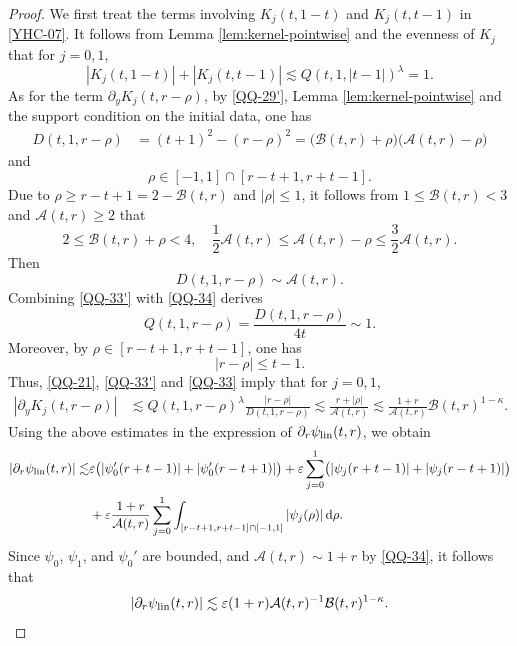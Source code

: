 \documentclass[11pt,twoside]{article}
\newcommand{\p}{\partial}
\newcommand{\ve}{\varepsilon}
\newcommand{\f}{\frac}
\newcommand{\Acal}{\mathcal A}
\newcommand{\Bcal}{\mathcal B}
\newcommand{\dd}{\,\mathrm{d}}
\theoremstyle{plain}
\theoremstyle{definition}
\theoremstyle{remark}
\numberwithin{equation}{section}
\begin{document}
\begin{proof}
We first treat the terms involving $K_j(t,1-t)$ and
$K_j(t,t-1)$ in \eqref{YHC-07}. It follows from Lemma \ref{lem:kernel-pointwise} and the evenness of $K_j$ that for $j=0,1$,
\[
|K_j(t,1-t)|
+|K_j(t,t-1)|\lesssim Q(t,1,|t-1|)^{\lambda}
=1.
\]
As for the  term $\p_yK_j(t,r-\rho)$, by \eqref{QQ-29'}, Lemma \ref{lem:kernel-pointwise} and the support condition on the initial
data, one has
\[
\begin{aligned}
D(t,1,r-\rho)
&=(t+1)^2-(r-\rho)^2=
\bigl(\Bcal(t,r)+\rho\bigr)
\bigl(\Acal(t,r)-\rho\bigr)
\end{aligned}
\]
and
\[
\rho\in[-1,1]\cap[r-t+1,r+t-1].
\]
Due to
$
\rho\geq r-t+1=2-\Bcal(t,r)
$
and $|\rho|\leq1$, it follows from $1\leq\Bcal(t,r)<3$ and $\Acal(t,r)\geq2$ that
\[
2\leq\Bcal(t,r)+\rho<4, \quad \f12\Acal(t,r)
\leq
\Acal(t,r)-\rho
\leq
\f32\Acal(t,r).
\]
Then
\begin{equation}\label{QQ-33'}
D(t,1,r-\rho)\sim\Acal(t,r).
\end{equation}
Combining \eqref{QQ-33'} with \eqref{QQ-34} derives
\begin{equation}\label{QQ-33}
Q(t,1,r-\rho)
=\f{D(t,1,r-\rho)}{4t}
\sim1.
\end{equation}
Moreover, by
$\rho\in[r-t+1,r+t-1]$, one has
\[
|r-\rho|\leq t-1.
\]
Thus, \eqref{QQ-21}, \eqref{QQ-33'} and \eqref{QQ-33} imply that
for $j=0,1$,
\[
\begin{aligned}
|\p_yK_j(t,r-\rho)|
&\lesssim
Q(t,1,r-\rho)^\lambda
\f{|r-\rho|}{D(t,1,r-\rho)}\lesssim
\f{r+|\rho|}{\Acal(t,r)}
\lesssim
\f{1+r}{\Acal(t,r)}\Bcal(t,r)^{1-\kappa}.
\end{aligned}
\]
Using the above estimates in the expression of
$\p_r\psi_{\rm lin}(t,r)$, we obtain
\[
\begin{aligned}
|\p_r\psi_{\rm lin}(t,r)|
\lesssim&
\ve\bigl(
|\psi_0'(r+t-1)|
+|\psi_0'(r-t+1)|
\bigr)+
\ve\sum_{j=0}^1
\bigl(
|\psi_j(r+t-1)|
+|\psi_j(r-t+1)|
\bigr)\\
&+\ve\f{1+r}{\Acal(t,r)}
\sum_{j=0}^1
\int_{[r-t+1,r+t-1]\cap[-1,1]}
|\psi_j(\rho)|\dd\rho.
\end{aligned}
\]
Since $\psi_0$, $\psi_1$, and $\psi_0'$ are bounded, and
$\Acal(t,r)\sim1+r$ by \eqref{QQ-34}, it follows that
\begin{equation}\label{QQ-35'}
|\p_r\psi_{\rm lin}(t,r)|
\lesssim
\ve(1+r)\Acal(t,r)^{-1}
\Bcal(t,r)^{1-\kappa}.
\end{equation}


\end{proof}
\end{document}
